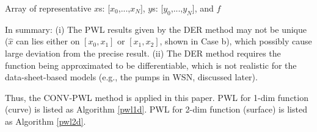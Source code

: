 \documentclass[journal,twoside,web]{ieeecolor}
\begin{document}
\begin{algorithm}[htbp]\footnotesize
\caption{$z=f(x,y)\overset{PWL}{\rightarrow}z=f^{PWL}(x,y)$}\label{pwl2d} 
\begin{algorithmic}[1]
\REQUIRE Array of representative $x$s: [$x_0$,...,$x_N$], $y$s: [$y_0$,...,$y_N$], and $f$
\label{line7}
\ENDIF
{}\label{line10}
\ENDIF
\ENDFOR
{}
\label{line16}
\ENDIF
\ENDFOR
\ENDFOR
\end{algorithmic}
\end{algorithm}

In summary: (i) The PWL results given by the DER method may not be unique ($\hat x$ can lies either on $[x_0,x_1]$ or $[x_1,x_2]$, shown in Case b), which possibly cause large deviation from the precise result. (ii) The DER method requires the function being approximated to be differentiable, which is not realistic for the data-sheet-based models (e.g., the pumps in WSN, discussed later).

Thus, the CONV-PWL method is applied in this paper.
PWL for 1-dim function (curve) is listed as Algorithm \ref{pwl1d}.
PWL for 2-dim function (surface) is listed as Algorithm \ref{pwl2d}.
\end{document}
